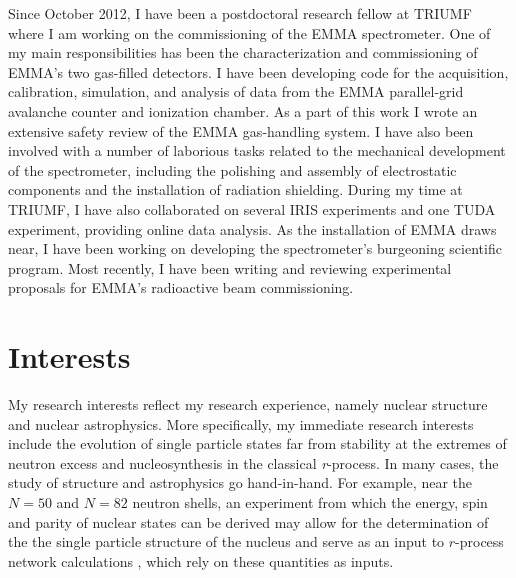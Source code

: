 Since October 2012,
I have been a postdoctoral research fellow at TRIUMF where I am working
on the commissioning of the EMMA %
spectrometer. %
 One of my main responsibilities has been the characterization and commissioning of EMMA's two gas-filled detectors. %
 I have been developing code for the acquisition, calibration, simulation, and analysis of data from the EMMA parallel-grid avalanche counter and ionization chamber. %
As a part of this work I wrote an extensive safety review of the EMMA gas-handling system. I have also been involved with a number of laborious tasks related to the mechanical development of the spectrometer, including the polishing and assembly of  electrostatic components and the installation of radiation shielding.
		During my time at TRIUMF,  I have also collaborated on several IRIS experiments and one TUDA experiment, providing online data analysis.
		 As the installation of EMMA draws near, I have been working on developing the  spectrometer's burgeoning scientific program.	Most recently, I have been writing and reviewing %
		experimental proposals for EMMA's radioactive beam commissioning.

\section*{Interests}
My research interests reflect my research experience, namely nuclear structure and nuclear astrophysics.  More specifically, my immediate 
research interests include %
 the evolution of single particle states far from stability at the extremes of neutron excess and nucleosynthesis in the classical \textit{r}-process. %
 In many cases, the study of structure
and astrophysics go hand-in-hand. For example, %
near the $N=50$ and $N=82$ neutron shells,  
an experiment from which 
the energy, spin and parity of nuclear states can be derived may allow for the determination of the 
the single particle structure of the nucleus and serve as an input to 
$r$-process%
network calculations 
, which
 rely on these quantities as inputs. %

